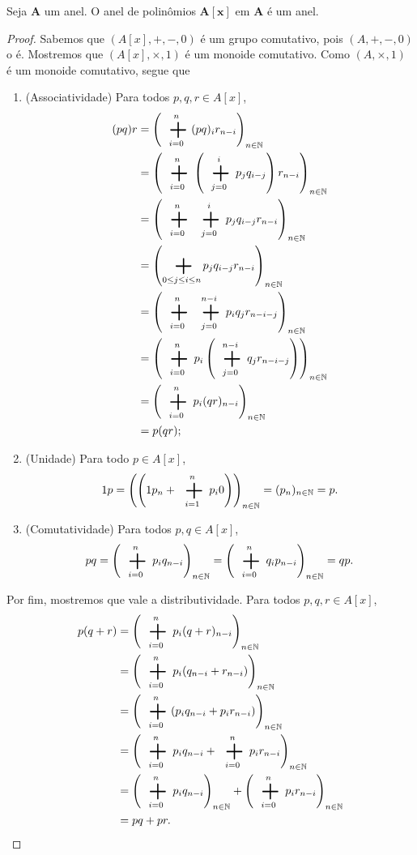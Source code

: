 \begin{proposition}
Seja $\bm A$ um anel. O anel de polinômios $\bm{A[x]}$ em $\bm A$ é um anel.
\end{proposition}
\begin{proof}
Sabemos que $(A[x],+,-,0)$ é um grupo comutativo, pois $(A,+,-,0)$ o é. Mostremos que $(A[x],\times,1)$ é um monoide comutativo. Como $(A,\times,1)$ é um monoide comutativo, segue que
	\begin{enumerate}
	\item (Associatividade) Para todos $p,q,r \in A[x]$,
		\begin{align*}
		(pq)r &= \left(\sum_{i=0}^n (pq)_i r_{n-i}\right)_{n \in \N} \\
			&= \left(\sum_{i=0}^n \left(\sum_{j=0}^i p_j q_{i-j}\right) r_{n-i}\right)_{n \in \N} \\
			&= \left(\sum_{i=0}^n \sum_{j=0}^i p_j q_{i-j} r_{n-i} \right)_{n \in \N} \\
			&= \left(\sum_{0 \leq j \leq i \leq n} p_j q_{i-j} r_{n-i} \right)_{n \in \N} \\
			&= \left(\sum_{i=0}^n \sum_{j=0}^{n-i} p_i q_j r_{n-i-j} \right)_{n \in \N}\\
			&= \left(\sum_{i=0}^n p_i \left(\sum_{j=0}^{n-i} q_j r_{n-i-j}\right)\right)_{n \in \N}\\
			&= \left(\sum_{i=0}^n p_i (qr)_{n-i}\right)_{n \in \N}\\
			&= p(qr);
		\end{align*}
	\item (Unidade) Para todo $p \in A[x]$,
		\begin{equation*}
		1p = \left(\left(1p_n + \sum_{i=1}^{n} p_i 0 \right)\right)_{n \in \N} = (p_n)_{n \in \N} = p.
		\end{equation*}
	\item (Comutatividade) Para todos $p,q \in A[x]$,
		\begin{equation*}
		pq = \left(\sum_{i=0}^n p_i q_{n-i}\right)_{n \in \N} = \left(\sum_{i=0}^n q_i p_{n-i}\right)_{n \in \N} = qp.
		\end{equation*}
	\end{enumerate}
Por fim, mostremos que vale a distributividade. Para todos $p,q,r \in A[x]$,
	\begin{align*}
	p (q + r) &= \left(\sum_{i=0}^n p_i (q+r)_{n-i}\right)_{n \in \N} \\
		&=  \left(\sum_{i=0}^n p_i (q_{n-i}+r_{n-i})\right)_{n \in \N} \\
		&=  \left(\sum_{i=0}^n (p_i q_{n-i} + p_i r_{n-i})\right)_{n \in \N} \\
		&=  \left(\sum_{i=0}^n p_i q_{n-i} + \sum_{i=0}^n p_i r_{n-i}\right)_{n \in \N} \\
		&= \left(\sum_{i=0}^n p_i q_{n-i}\right)_{n \in \N} + \left(\sum_{i=0}^n p_i r_{n-i}\right)_{n \in \N} \\
		&= pq+pr.
	\end{align*}	
\end{proof}

